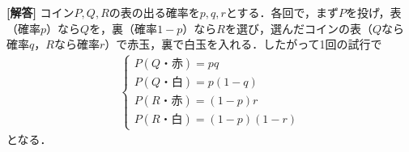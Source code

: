 \documentclass[../../main.tex]{subfiles}
\begin{document}
\begin{oframed}
  
\end{oframed}

{\bf [解答]}
コイン$P,Q,R$の表の出る確率を$p,q,r$とする．各回で，まず$P$を投げ，表（確率$p$）なら$Q$を，裏（確率$1-p$）なら$R$を選び，選んだコインの表（$Q$なら確率$q$，$R$なら確率$r$）で赤玉，裏で白玉を入れる．したがって1回の試行で
\begin{align}
  \begin{cases}
    P(Q\text{・赤})=pq \\
    P(Q\text{・白})=p(1-q) \\
    P(R\text{・赤})=(1-p)r \\
    P(R\text{・白})=(1-p)(1-r)
  \end{cases}
\end{align}
となる．
\end{document}
